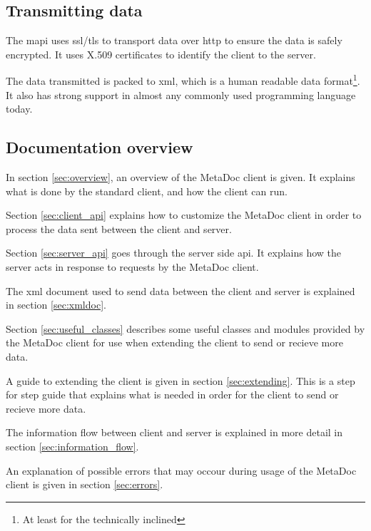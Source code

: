 \subsection{Transmitting data}
The \gls{mapi} uses \gls{ssl}/\gls{tls} to transport data over \gls{http} to
ensure the data is safely encrypted. It uses X.509 certificates to identify the
client to the server. 

The data transmitted is packed to \gls{xml}, which is a human readable data
format\footnote{At least for the technically inclined}. It also has strong
support in almost any commonly used programming language today.  

\subsection{Documentation overview}
In section \ref{sec:overview}, an overview of the MetaDoc client is given. It
explains what is done by the standard client, and how the client can run. 

Section \ref{sec:client_api} explains how to customize the MetaDoc client in
order to process the data sent between the client and server. 

Section \ref{sec:server_api} goes through the server side \gls{api}. It
explains how the server acts in response to requests by the MetaDoc client. 

The \gls{xml} document used to send data between the client and server is
explained in section \ref{sec:xmldoc}. 

Section \ref{sec:useful_classes} describes some useful classes and modules
provided by the MetaDoc client for use when extending the client to send or
recieve more data. 

A guide to extending the client is given in section \ref{sec:extending}. This
is a step for step guide that explains what is needed in order for the client
to send or recieve more data. 

The information flow between client and server is explained in more detail in
section \ref{sec:information_flow}.

An explanation of possible errors that may occour during usage of the MetaDoc
client is given in section \ref{sec:errors}. 
